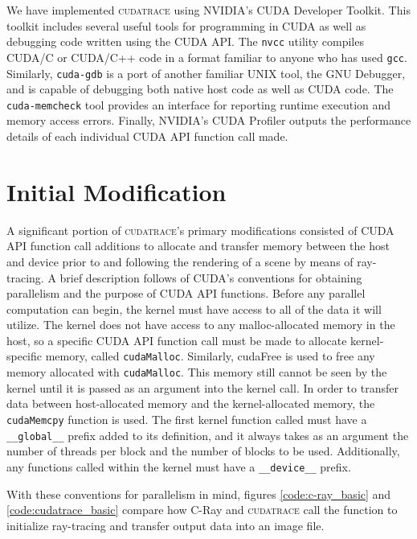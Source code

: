 \documentclass[12pt]{article}
\begin{document}
We have implemented \textsc{cudatrace} using NVIDIA's CUDA Developer Toolkit. This toolkit includes several useful tools for programming in CUDA as well as debugging code written using the CUDA API. The \texttt{nvcc} utility compiles CUDA/C or CUDA/C++ code in a format familiar to anyone who has used \texttt{gcc}. Similarly, \texttt{cuda-gdb} is a port of another familiar UNIX tool, the GNU Debugger, and is capable of debugging both native host code as well as CUDA code. The \texttt{cuda-memcheck} tool provides an interface for reporting runtime execution and memory access errors. Finally, NVIDIA's CUDA Profiler outputs the performance details of each individual CUDA API function call made.


\section{Initial Modification}
A significant portion of \textsc{cudatrace}'s primary modifications consisted of CUDA API function call additions to allocate and transfer memory between the host and device prior to and following the rendering of a scene by means of ray-tracing. A brief description follows of CUDA's conventions for obtaining parallelism and the purpose of CUDA API functions. Before any parallel computation can begin, the kernel must have access to all of the data it will utilize. The kernel does not have access to any malloc-allocated memory in the host, so a specific CUDA API function call must be made to allocate kernel-specific memory, called \texttt{cudaMalloc}. Similarly, cudaFree is used to free any memory allocated with \texttt{cudaMalloc}. This memory still cannot be seen by the kernel until it is passed as an argument into the kernel call. In order to transfer data between host-allocated memory and the kernel-allocated memory, the \texttt{cudaMemcpy} function is used. The first kernel function called must have a \texttt{\_\_global\_\_} prefix added to its definition, and it always takes as an argument the number of threads per block and the number of blocks to be used. Additionally, any functions called within the kernel must have a \texttt{\_\_device\_\_} prefix.    

With these conventions for parallelism in mind, figures \ref{code:c-ray_basic} and \ref{code:cudatrace_basic} compare how C-Ray and \textsc{cudatrace} call the function to initialize ray-tracing and transfer output data into an image file.
\end{document}
